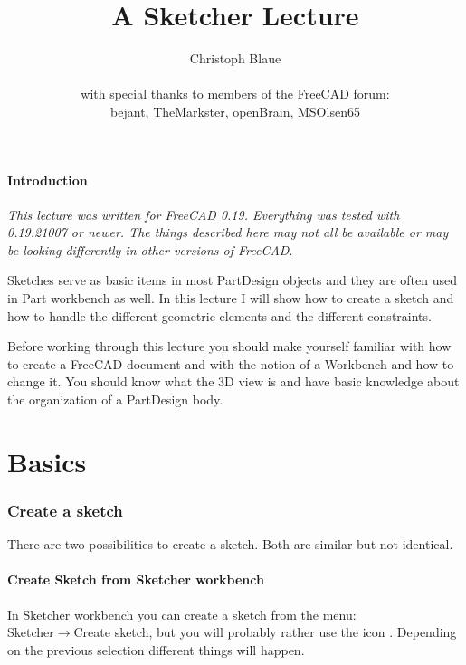 \documentclass[12pt,titlepage]{article}
\title{A Sketcher Lecture}
\author{Christoph Blaue\\
\\
\scriptsize with special thanks to members of the \href{https://forum.freecadweb.org}{FreeCAD forum}:\\
\small bejant,
TheMarkster,
openBrain,
MSOlsen65
}
\newcommand{\menu}{\mbox{$\rightarrow$}}
\newcommand{\icon}[1]{\raisebox{-1em}{\rule{0pt}{27pt}\texttt{[image: images/\#1]}}}
\let\partOrigin\part
\renewcommand\part{\newpage\partOrigin}
\newcommand{\currentVersion}{0.19.21007}
\begin{document}
\maketitle
\setcounter{page}{2}

\tableofcontents
\newpage

\subsection*{Introduction} {\em This lecture was written for FreeCAD 0.19. Everything was tested with \currentVersion{} or newer. The things described here may not all be available or may be looking differently in other versions of FreeCAD}. \vspace{2.5em}

Sketches serve as basic items in most PartDesign objects and they are often used in Part workbench as well. In this lecture I will show how to create a sketch and how to handle the different geometric elements and the different constraints.

Before working through this lecture you should make yourself familiar with how to create a FreeCAD document and with the notion of a Workbench and how to change it. You should know what the 3D view is and have basic knowledge about the organization of a PartDesign body.

\part{Basics}

\section{Create a sketch} There are two possibilities to create a sketch. Both are similar but not identical.

\subsection{Create Sketch from Sketcher workbench} In Sketcher workbench you can create a sketch from the menu:\\ Sketcher\menu Create sketch, but you will probably rather use the icon \icon{Sketcher_NewSketch}. Depending on the previous selection different things will happen.
\end{document}

